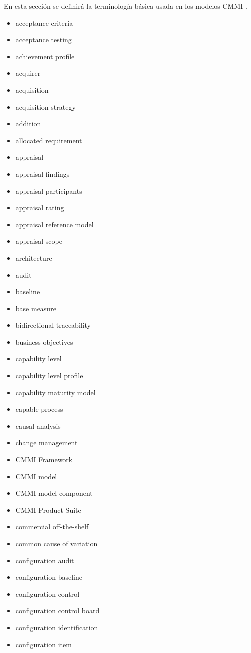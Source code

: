 En esta sección se definirá la terminología básica usada en los modelos CMMI \cite{term}.

 
\begin{itemize}
\item acceptance criteria
\item acceptance testing
\item achievement profile
\item acquirer
\item acquisition
\item acquisition strategy
\item addition
\item allocated requirement
\item appraisal
\item appraisal findings
\item appraisal participants
\item appraisal rating
\item appraisal reference model
\item appraisal scope
\item architecture
\item audit
\item baseline
\item base measure
\item bidirectional traceability
\item business objectives
\item capability level
\item capability level profile
\item capability maturity model
\item capable process
\item causal analysis
\item change management
\item CMMI Framework
\item CMMI model
\item CMMI model component
\item CMMI Product Suite
\item commercial off-the-shelf
\item common cause of variation
\item configuration audit
\item configuration baseline
\item configuration control
\item configuration control board
\item configuration identification
\item configuration item

\end{itemize}
